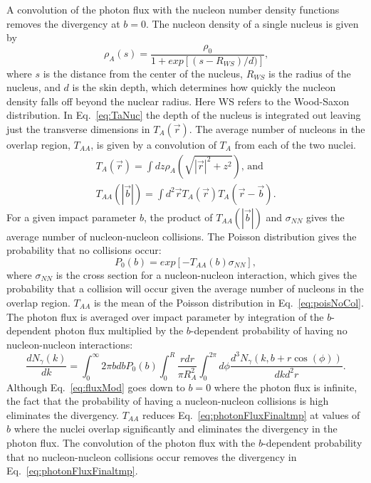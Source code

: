     A convolution of the photon flux with the nucleon number density functions 
      removes the divergency at $b=0$. 
    The nucleon density of a single nucleus is given by
    \begin{equation} 
      \rho_{A}(s)=\frac{\rho_{0}}{1+exp[(s-R_{WS})/d)]}\textrm{,}
      \label{eq:woodsSaxon}
    \end{equation}
    where $s$ is the distance from the center of the 
      nucleus, $R_{WS}$ is the radius of the nucleus, and $d$ is the skin depth, 
      which determines how quickly the nucleon density falls off beyond the 
      nuclear radius.
    Here WS refers to the Wood-Saxon distribution. 
    In Eq.~\ref{eq:TaNuc} the depth of the nucleus is integrated out leaving
    just the transverse dimensions in $T_{A}(\vec{r})$.
    The average number of nucleons in the overlap region, $T_{AA}$, is given by
      a convolution of $T_A$ from each of the two nuclei.
    \begin{eqnarray} \label{eq:TaNuc}
      T_{A}(\vec{r})=\int{dz\rho_{A}(\sqrt{|\vec{r}|^{2}+z^{2}})}\textrm{, and} \nonumber \\ 
      T_{AA}(|\vec{b}|)=\int{d^{2}\vec{r}T_{A}(\vec{r})T_{A}(\vec{r}-\vec{b})}\textrm{.}
    \end{eqnarray}
    For a given impact parameter $b$, the product of $T_{AA}(|\vec{b}|)$ and
      $\sigma_{NN}$ gives the average number of nucleon-nucleon collisions.
    The Poisson distribution gives the probability that no collisions 
      occur:
    \begin{equation} \label{eq:poisNoCol}
      P_{0}(b)=exp[-T_{AA}(b)\sigma_{NN}],
    \end{equation}
      where $\sigma_{NN}$ is the cross section for a 
      nucleon-nucleon interaction, which gives the probability that a collision
      will occur given the average number of nucleons in the overlap region.
    $T_{AA}$ is the mean of the Poisson distribution in Eq.~\ref{eq:poisNoCol}.
    The photon flux is averaged over impact parameter by integration of the 
      $b$-dependent photon flux multiplied by the $b$-dependent probability of having no 
      nucleon-nucleon interactions: 
    \begin{equation} \label{eq:fluxMod}
      \frac{dN_{\gamma}(k)}{dk}=\int_{0}^{\infty}{2\pi bdbP_{0}(b)
         \int_{0}^{R}{\frac{rdr}{\pi R^{2}_{A}}\int_{0}^{2\pi}d\phi
         \frac{d^{3}N_{\gamma}(k,b+r\cos(\phi))}{dkd^{2}r}}}.
    \end{equation}
    Although Eq.~\ref{eq:fluxMod} goes down to $b=0$ where the photon flux is 
      infinite, the fact that the probability of having a nucleon-nucleon collisions 
      is high eliminates the divergency.
    $T_{AA}$ reduces Eq.~\ref{eq:photonFluxFinaltmp} at values of $b$ where the
      nuclei overlap significantly and eliminates the divergency in the photon 
      flux. 
    The convolution of the photon flux with the $b$-dependent probability that 
      no nucleon-nucleon collisions occur removes the divergency in 
      Eq.~\ref{eq:photonFluxFinaltmp}. 

